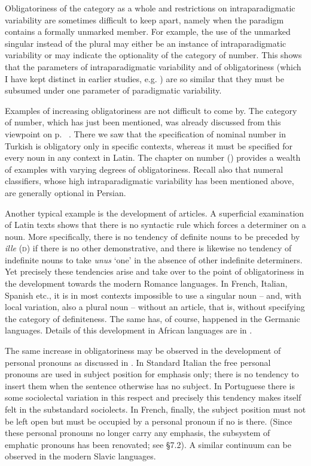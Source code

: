Obligatoriness of the category as a whole and restrictions on intraparadigmatic variability are sometimes difficult to keep apart, namely when the paradigm contains a formally unmarked member. For example, the use of the unmarked singular instead of the plural may either be an instance of intraparadigmatic variability or may indicate the optionality of the category of number. This shows that the parameters of intraparadigmatic variability and of obligatoriness (which I have kept distinct in earlier studies, e.g. \citealt[234ff]{Lehmann1982b}) are so similar that they must be subsumed under one parameter of paradigmatic variability.

Examples of increasing obligatoriness are not difficult to come by. The category of number, which has just been mentioned, was already discussed from this viewpoint on p.~\pageref{page14}\chk%
. There we saw that the specification of nominal number in Turkish is obligatory only in specific contexts, whereas it must be specified for every noun in any context in Latin. The chapter on number () provides a wealth of examples with varying degrees of obligatoriness. Recall also that numeral classifiers, whose high intraparadigmatic variability has been mentioned above, are generally optional in Persian.

Another typical example is the development of articles. A superficial examination of Latin texts shows that there is no syntactic rule which forces a determiner on a noun. More specifically, there is no tendency of definite nouns to be preceded by \textit{ille} (\textsc{d}) if there is no other demonstrative, and there is likewise no tendency of indefinite nouns to take \textit{unus} ‘one’ in the absence of other indefinite determiners. Yet precisely these tendencies arise and take over to the point of obligatoriness in the development towards the modern Romance languages. In French, Italian, Spanish etc., it is in most contexts impossible to use a singular noun -- and, with local variation, also a plural noun -- without an article, that is, without specifying the category of definiteness. The same has, of course, happened in the Germanic languages. Details of this development in African languages are in \citet[§3.3.--3.5]{Greenberg1978}.

The same increase in obligatoriness may be observed in the development of personal pronouns as discussed in . In Standard Italian the free personal pronouns are used in subject position for emphasis only; there is no tendency to insert them when the sentence otherwise has no subject. In Portuguese there is some sociolectal variation in this respect and precisely this tendency makes itself felt in the substandard sociolects. In French, finally, the subject position must not be left open but must be occupied by a personal pronoun if no \np is there. (Since these personal pronouns no longer carry any emphasis, the subsystem of emphatic pronouns has been renovated; see §7.2). A similar continuum can be observed in the modern Slavic languages.

